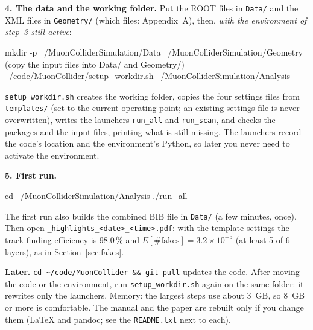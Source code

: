 \documentclass[11pt,letterpaper]{article}
\newcommand{\code}[1]{\texttt{#1}}
\newcommand{\Efakes}{\ensuremath{E[\#\mathrm{fakes}]}}
\begin{document}
\textbf{4. The data and the working folder.} Put the ROOT files in
\code{Data/} and the XML files in \code{Geometry/} (which files:
Appendix~A), then, \emph{with the environment of step~3 still active}:
\begin{shell}
mkdir -p ~/MuonColliderSimulation/Data ~/MuonColliderSimulation/Geometry
   (copy the input files into Data/ and Geometry/)
~/code/MuonCollider/setup_workdir.sh ~/MuonColliderSimulation/Analysis
\end{shell}
\code{setup\_workdir.sh} creates the working folder, copies the four
settings files from \code{templates/} (set to the current operating point;
an existing settings file is never overwritten), writes the launchers
\code{run\_all} and \code{run\_scan}, and checks the packages and the input
files, printing what is still missing. The launchers record the code's
location and the environment's Python, so later you never need to activate
the environment.

\textbf{5. First run.}
\begin{shell}
cd ~/MuonColliderSimulation/Analysis
./run_all
\end{shell}
The first run also builds the combined BIB file in \code{Data/} (a few
minutes, once). Then open \code{\_highlights\_<date>\_<time>.pdf}: with the
template settings the track-finding efficiency is 98.0\,\% and
$\Efakes = 3.2\times10^{-5}$ (at least 5 of 6 layers), as in Section~\ref{sec:fakes}.

\textbf{Later.} \code{cd \textasciitilde/code/MuonCollider \&\& git pull}
updates the code. After moving the code or the environment, run
\code{setup\_workdir.sh} again on the same folder: it rewrites only the
launchers. Memory: the largest steps use about 3~GB, so 8~GB or more is
comfortable. The manual and the paper are rebuilt only if you change them
(LaTeX and pandoc; see the \code{README.txt} next to each).

\end{document}
